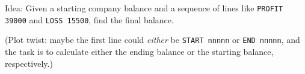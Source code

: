 

Idea: Given a starting company balance and a sequence of lines like \texttt{PROFIT 39000}
and \texttt{LOSS 15500}, find the final balance.

(Plot twist: maybe the first line could \emph{either} be \texttt{START nnnnn} or
\texttt{END nnnnn}, and the task is to calculate either the ending balance or the starting
balance, respectively.)
